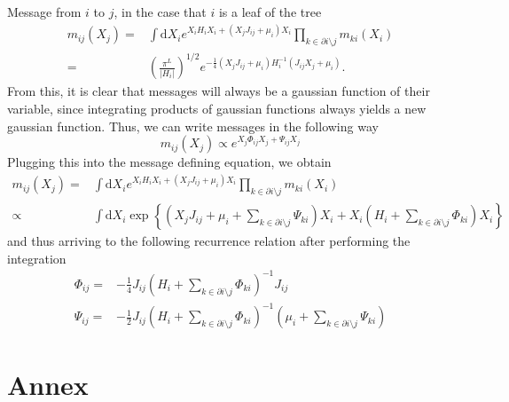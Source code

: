 \documentclass[10pt]{article}
\newcommand{\ddroit}{\textrm{d}}
\begin{document}
Message from $i$ to $j$, in the case that $i$ is a leaf of the tree
\begin{equation}
  \begin{split}
    m_{ij}(X_j) =& \int\ddroit X_i e^{X_iH_iX_i + (X_jJ_{ij} + \mu_i)X_i}\prod_{k\in\partial i\setminus j}m_{ki}(X_i)\\
                =& \left( \frac{\pi^L}{\vert H_i\vert} \right)^{1/2}e^{-\frac{1}{4}(X_jJ_{ij} + \mu_i)H_i^{-1}(J_{ij}X_j+\mu_i)}.
  \end{split}
\end{equation}
From this, it is clear that messages will always be a gaussian function of their variable, since integrating products of gaussian functions always yields a new gaussian function. Thus, we can write messages in the following way
\begin{equation}
  m_{ij}(X_j) \propto e^{X_j\Phi_{ij}X_j + \Psi_{ij}X_j}
\end{equation}
Plugging this into the message defining equation, we obtain
\begin{equation}
  \begin{split}
  m_{ij}(X_j) =& \int\ddroit X_i e^{X_iH_iX_i + (X_jJ_{ij} + \mu_i)X_i}\prod_{k\in\partial i\setminus j}m_{ki}(X_i)\\
              \propto& \int\ddroit X_i \exp\left\{\left(X_jJ_{ij}+\mu_i + \sum_{k\in\partial i\setminus j}\Psi_{ki}\right)X_i + X_i\left(H_i + \sum_{k\in\partial i\setminus j}\Phi_{ki}\right)X_i \right\}
  \end{split}
\end{equation}
and thus arriving to the following recurrence relation after performing the integration
\begin{equation}
\begin{split}
  \Phi_{ij} =& -\frac{1}{4} J_{ij}\left( H_i + \sum_{k\in\partial i\setminus j}\Phi_{ki} \right)^{-1}J_{ij}\\
  \Psi_{ij} =& -\frac{1}{2}J_{ij}\left(H_i + \sum_{k\in\partial i\setminus j}\Phi_{ki}\right)^{-1}\left(\mu_i+\sum_{k\in\partial i\setminus j}\Psi_{ki}\right)
\end{split}
\end{equation}


\section{Annex} %
\label{sec:annex}
\end{document}
